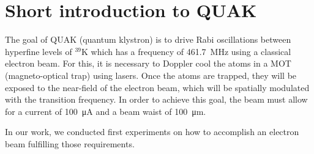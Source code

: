 
\chapter{Short introduction to QUAK}
\label{ch:Short introduction to QuaK}

The goal of QUAK (quantum klystron) is to drive Rabi oscillations between hyperfine levels of $^{39}\mathrm{K}$ which has a frequency of \SI{461.7}{\mega\hertz} \cite{tiecke:potassium-properties} using a classical electron beam. For this, it is necessary to Doppler cool the atoms in a MOT (magneto-optical trap) using lasers. Once the atoms are trapped, they will be exposed to the near-field of the electron beam, which will be spatially modulated with the transition frequency. In order to achieve this goal, the beam must allow for a current of \SI{100}{\micro\ampere}
and a beam waist of \SI{100}{\micro\meter}.

In our work, we conducted first experiments on how to accomplish an electron beam fulfilling those requirements.